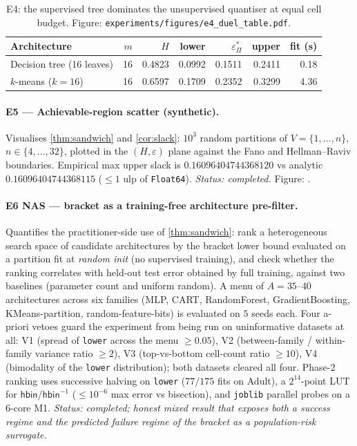 \documentclass[10pt]{article}
\theoremstyle{definition}
\theoremstyle{remark}
\newcommand{\eps}{\varepsilon}
\begin{document}
\begin{table}[h]\centering\small
\begin{tabular}{lrrrrrr}
\toprule
Architecture & $m$ & $H$ & lower & $\eps^{*}_{\Pi}$ & upper & fit (s) \\
\midrule
Decision tree (16 leaves) & 16 & 0.4823 & 0.0992 & 0.1511 & 0.2411 & 0.18 \\
$k$-means ($k=16$)        & 16 & 0.6597 & 0.1709 & 0.2352 & 0.3299 & 4.36 \\
\bottomrule
\end{tabular}
\caption{E4: the supervised tree dominates the unsupervised
quantiser at equal cell budget.
Figure: \texttt{experiments/figures/e4\_duel\_table.pdf}.}
\label{tab:e4}
\end{table}

\paragraph{E5 --- Achievable-region scatter (synthetic).}
Visualises \cref{thm:sandwich} and \cref{cor:slack}: $10^{3}$
random partitions of $V = \{1, \ldots, n\}$, $n \in \{4, \ldots, 32\}$,
plotted in the $(H, \eps)$ plane against the Fano and
Hellman--Raviv boundaries. Empirical max upper slack is
$0.16096404744368120$ vs analytic $0.16096404744368115$
($\le 1$ ulp of \texttt{Float64}). \emph{Status: completed.}
Figure: .

\paragraph{E6 NAS --- bracket as a training-free architecture
pre-filter.}
Quantifies the practitioner-side use of \cref{thm:sandwich}:
rank a heterogeneous search space of candidate architectures by
the bracket lower bound evaluated on a partition fit at
\emph{random init} (no supervised training), and check whether
the ranking correlates with held-out test error obtained by full
training, against two baselines (parameter count and uniform
random). A menu of $A = 35$--$40$ architectures across six
families (MLP, CART, RandomForest, GradientBoosting,
KMeans-partition, random-feature-bits) is evaluated on $5$
seeds each. Four a-priori vetoes guard the experiment from
being run on uninformative datasets at all: V1 (spread of
\texttt{lower} across the menu $\ge 0.05$), V2
(between-family / within-family variance ratio $\ge 2$),
V3 (top-vs-bottom cell-count ratio $\ge 10$), V4 (bimodality
of the \texttt{lower} distribution); both datasets cleared all
four. Phase-2 ranking uses successive halving on \texttt{lower}
($77/175$ fits on Adult), a $2^{14}$-point LUT for
$\mathsf{hbin}$/$\mathsf{hbin}^{-1}$ ($\le 10^{-6}$ max error
vs bisection), and \texttt{joblib} parallel probes on a 6-core
M1. \emph{Status: completed; honest mixed result that exposes
both a success regime and the predicted failure regime of the
bracket as a population-risk surrogate.}
\end{document}
